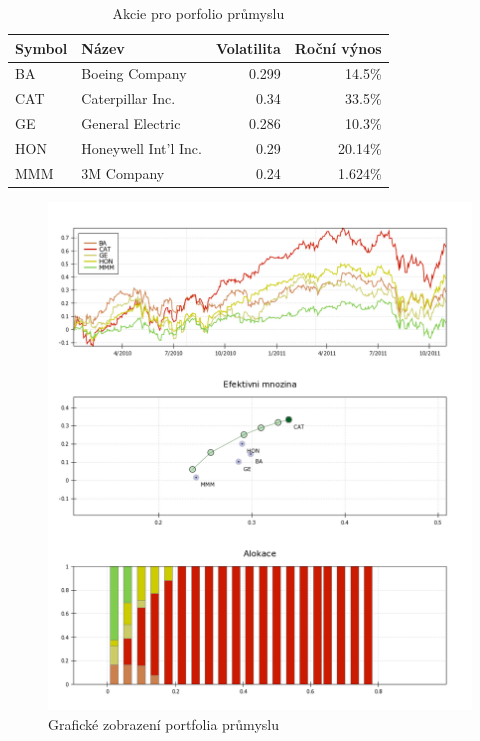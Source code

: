 \documentclass[a4paper,12pt]{report}
\begin{document}
    \begin{table}[htb]
      \centering
      \begin{tabular}{|l|l|r|r|}
        \hline
        Symbol&Název&Volatilita&Roční výnos\\\hline\hline
        BA&Boeing Company &0.299&14.5\%\\\hline
        CAT&Caterpillar Inc. &0.34&33.5\%\\\hline
        GE&General Electric &0.286&10.3\%\\\hline
        HON&Honeywell Int'l Inc. &0.29&20.14\%\\\hline
        MMM&3M Company &0.24&1.624\%\\\hline
      \end{tabular}
      \caption{Akcie pro porfolio průmyslu}
    \end{table}

    \begin{figure}[htb]
      \centering
        \includegraphics[height=0.95\textheight]{ind1.png}
       \caption{Grafické zobrazení portfolia průmyslu}
    \end{figure}
\end{document}
